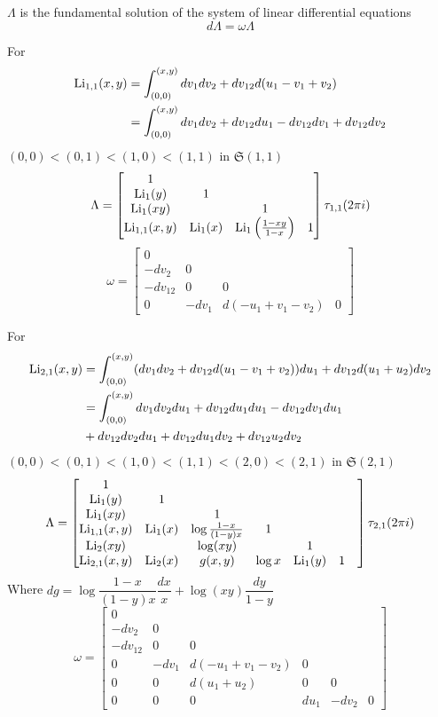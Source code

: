 \documentclass[main]{subfiles}
\begin{document}
\begin{theorem}
$\Lambda$ is the fundamental solution of the system of linear differential equations
\[d\Lambda=\omega\Lambda\]
\end{theorem}

\begin{example}
For
\begin{align*}
\operatorname{Li}_{1,1}(x,y)&=\int_{(0,0)}^{(x,y)}dv_1dv_2+dv_{12}d(u_1-v_1+v_2) \\
&=\int_{(0,0)}^{(x,y)}dv_1dv_2+dv_{12}du_1-dv_{12}dv_1+dv_{12}dv_2
\end{align*}
$(0,0)<(0,1)<(1,0)<(1,1)$ in $\mathfrak S(1,1)$
\[\Lambda=\begin{bmatrix}
1&&&\\
\operatorname{Li}_1(y)&1&&\\
\operatorname{Li}_1(xy)&&1&\\
\operatorname{Li}_{1,1}(x,y)&\operatorname{Li}_1(x)&\operatorname{Li}_1\left(\frac{1-xy}{1-x}\right)&1
\end{bmatrix}\tau_{1,1}(2\pi i)\]
\[\omega=\begin{bmatrix}
0&&&\\
-dv_2&0&&\\
-dv_{12}&0&0&\\
0&-dv_1&d(-u_1+v_1-v_2)&0
\end{bmatrix}\]
\end{example}

\begin{example}
For
\begin{align*}
\operatorname{Li}_{2,1}(x,y)&=\int_{(0,0)}^{(x,y)}(dv_1dv_2+dv_{12}d(u_1-v_1+v_2))du_1+dv_{12}d(u_1+u_2)dv_2 \\
&=\int_{(0,0)}^{(x,y)}dv_1dv_2du_1+dv_{12}du_1du_1-dv_{12}dv_1du_1 \\
&+dv_{12}dv_2du_1+dv_{12}du_1dv_2+dv_{12}u_2dv_2
\end{align*}
$(0,0)<(0,1)<(1,0)<(1,1)<(2,0)<(2,1)$ in $\mathfrak S(2,1)$
\[\Lambda=\begin{bmatrix}
1&&&&&&\\
\operatorname{Li}_{1}(y)&1&&&&\\
\operatorname{Li}_{1}(xy)&&1&&&\\
\operatorname{Li}_{1,1}(x,y)&\operatorname{Li}_1(x)&\log\frac{1-x}{(1-y)x}&1&&\\
\operatorname{Li}_{2}(xy)&&\log(xy)&&1&\\
\operatorname{Li}_{2,1}(x,y)&\operatorname{Li}_2(x)&g(x,y)&\log x&\operatorname{Li}_1(y)&1
\end{bmatrix}\tau_{2,1}(2\pi i)\]
Where $dg=\log\dfrac{1-x}{(1-y)x}\dfrac{dx}{x}+\log(xy)\dfrac{dy}{1-y}$
\[\omega=\begin{bmatrix}
0&&&&&\\
-dv_2&0&&&&\\
-dv_{12}&0&0&&\\
0&-dv_1&d(-u_1+v_1-v_2)&0&&\\
0&0&d(u_1+u_2)&0&0&\\
0&0&0&du_1&-dv_2&0
\end{bmatrix}\]
\end{example}
\end{document}
